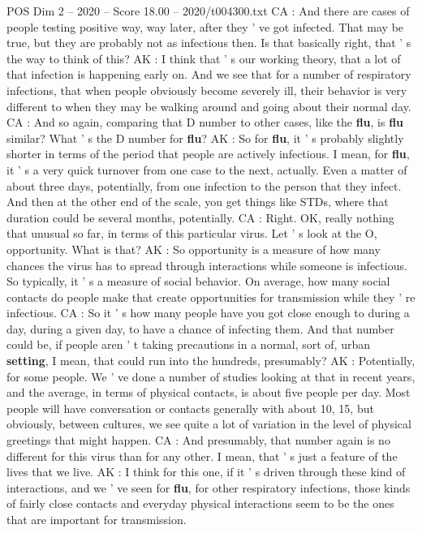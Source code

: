 \begin{textsample}{POS Dim 2 – 2020 – Score 18.00 – 2020/t004300.txt}
CA : And there are cases of people testing positive way, way later, after they ' ve got infected.
That may be true, but they are probably not as infectious then.
Is that basically right, that ' s the way to think of this?
AK : I think that ' s our working theory, that a lot of that infection is happening early on.
And we see that for a number of respiratory infections, that when people obviously become severely ill, their behavior is very different to when they may be walking around and going about their normal day.
CA : And so again, comparing that D number to other cases, like the \textbf{flu}, is \textbf{flu} similar?
What ' s the D number for \textbf{flu}?
AK : So for \textbf{flu}, it ' s probably slightly shorter in terms of the period that people are actively infectious.
I mean, for \textbf{flu}, it ' s a very quick turnover from one case to the next, actually.
Even a matter of about three days, potentially, from one infection to the person that they infect.
And then at the other end of the scale, you get things like STDs, where that duration could be several months, potentially.
CA : Right.
OK, really nothing that unusual so far, in terms of this particular virus.
Let ' s look at the O, opportunity.
What is that?
AK : So opportunity is a measure of how many chances the virus has to spread through interactions while someone is infectious.
So typically, it ' s a measure of social behavior.
On average, how many social contacts do people make that create opportunities for transmission while they ' re infectious.
CA : So it ' s how many people have you got close enough to during a day, during a given day, to have a chance of infecting them.
And that number could be, if people aren ' t taking precautions in a normal, sort of, urban \textbf{setting}, I mean, that could run into the hundreds, presumably?
AK : Potentially, for some people.
We ' ve done a number of studies looking at that in recent years, and the average, in terms of physical contacts, is about five people per day.
Most people will have conversation or contacts generally with about 10, 15, but obviously, between cultures, we see quite a lot of variation in the level of physical greetings that might happen.
CA : And presumably, that number again is no different for this virus than for any other.
I mean, that ' s just a feature of the lives that we live.
AK : I think for this one, if it ' s driven through these kind of interactions, and we ' ve seen for \textbf{flu}, for other respiratory infections, those kinds of fairly close contacts and everyday physical interactions seem to be the ones that are important for transmission.

\end{textsample}
